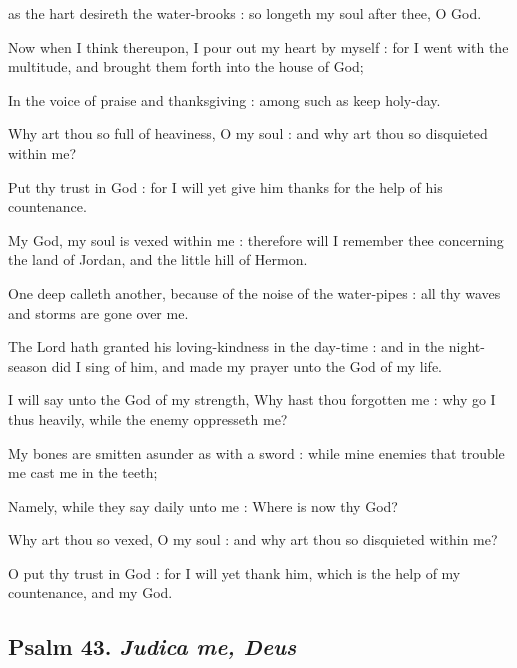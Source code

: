  as the hart desireth the water-brooks : so longeth my soul after thee, O God.\par
{}
Now when I think thereupon, I pour out my heart by myself : for I went with the multitude, and brought them forth into the house of God;\par
{}In the voice of praise and thanksgiving : among such as keep holy-day.\par
{}Why art thou so full of heaviness, O my soul : and why art thou so disquieted within me?\par
{}Put thy trust in God : for I will yet give him thanks for the help of his countenance.\par
{}My God, my soul is vexed within me : therefore will I remember thee concerning the land of Jordan, and the little hill of Hermon.\par
{}One deep calleth another, because of the noise of the water-pipes : all thy waves and storms are gone over me.\par
{}The Lord hath granted his loving-kindness in the day-time : and in the night-season did I sing of him, and made my prayer unto the God of my life.\par
{}I will say unto the God of my strength, Why hast thou forgotten me : why go I thus heavily, while the enemy oppresseth me?\par
{}My bones are smitten asunder as with a sword : while mine enemies that trouble me cast me in the teeth;\par
{}Namely, while they say daily unto me : Where is now thy God?\par
{}Why art thou so vexed, O my soul : and why art thou so disquieted within me?\par
{}O put thy trust in God : for I will yet thank him, which is the help of my countenance, and my God.\par

\subsection{Psalm 43. \textit{Judica me, Deus}}

